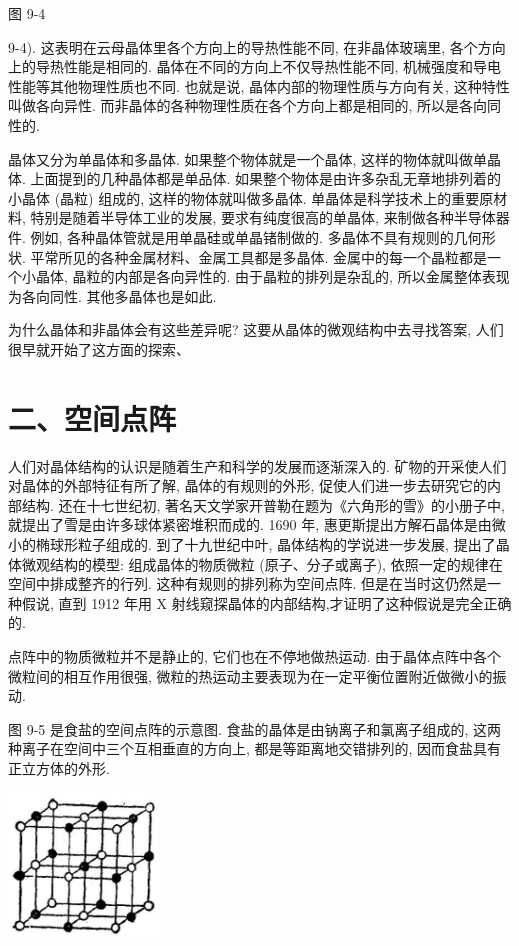 \documentclass[10pt]{article}
\begin{document}
图 9-4

9-4). 这表明在云母晶体里各个方向上的导热性能不同, 在非晶体玻璃里, 各个方向上的导热性能是相同的. 晶体在不同的方向上不仅导热性能不同, 机械强度和导电性能等其他物理性质也不同. 也就是说, 晶体内部的物理性质与方向有关, 这种特性叫做各向异性. 而非晶体的各种物理性质在各个方向上都是相同的, 所以是各向同性的.

晶体又分为单晶体和多晶体. 如果整个物体就是一个晶体, 这样的物体就叫做单晶体. 上面提到的几种晶体都是单品体. 如果整个物体是由许多杂乱无章地排列着的小晶体 (晶粒) 组成的, 这样的物体就叫做多晶体. 单晶体是科学技术上的重要原材料, 特别是随着半导体工业的发展, 要求有纯度很高的单晶体, 来制做各种半导体器件. 例如, 各种晶体管就是用单晶硅或单晶锗制做的. 多晶体不具有规则的几何形状. 平常所见的各种金属材料、金属工具都是多晶体. 金属中的每一个晶粒都是一个小晶体, 晶粒的内部是各向异性的. 由于晶粒的排列是杂乱的, 所以金属整体表现为各向同性. 其他多晶体也是如此.

为什么晶体和非晶体会有这些差异呢? 这要从晶体的微观结构中去寻找答案, 人们很早就开始了这方面的探索、

\section*{二、空间点阵}

人们对晶体结构的认识是随着生产和科学的发展而逐渐深入的. 矿物的开采使人们对晶体的外部特征有所了解, 晶体的有规则的外形, 促使人们进一步去研究它的内部结构. 还在十七世纪初, 著名天文学家开普勒在题为《六角形的雪》的小册子中, 就提出了雪是由许多球体紧密堆积而成的. 1690 年, 惠更斯提出方解石晶体是由微小的椭球形粒子组成的. 到了十九世纪中叶, 晶体结构的学说进一步发展, 提出了晶体微观结构的模型: 组成晶体的物质微粒 (原子、分子或离子), 依照一定的规律在空间中排成整齐的行列. 这种有规则的排列称为空间点阵. 但是在当时这仍然是一种假说, 直到 1912 年用 \(\mathrm{X}\) 射线窥探晶体的内部结构,才证明了这种假说是完全正确的.

点阵中的物质微粒并不是静止的, 它们也在不停地做热运动. 由于晶体点阵中各个微粒间的相互作用很强, 微粒的热运动主要表现为在一定平衡位置附近做微小的振动.

图 9-5 是食盐的空间点阵的示意图. 食盐的晶体是由钠离子和氯离子组成的, 这两种离子在空间中三个互相垂直的方向上, 都是等距离地交错排列的, 因而食盐具有正立方体的外形.

\begin{center}
\includegraphics[max width=0.3\textwidth]{images/01912d55-147c-70aa-b0e0-1782a122f948_263_837787.jpg}
\end{center}
\end{document}
